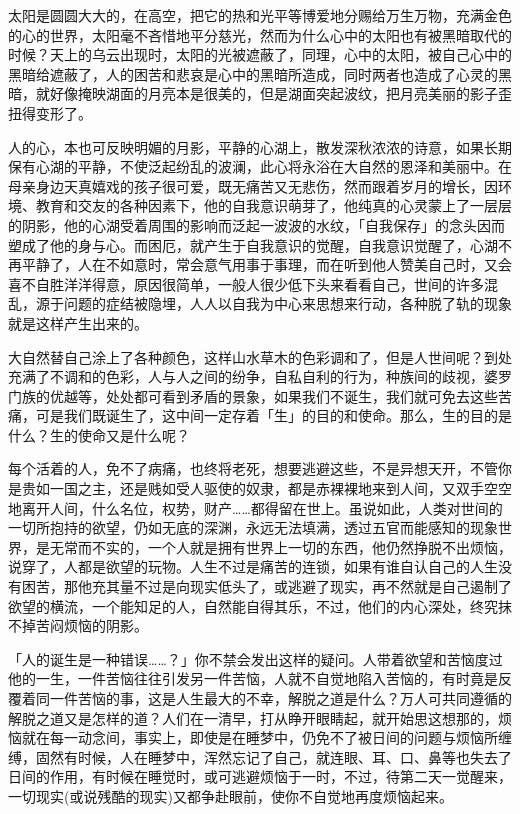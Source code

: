 \documentclass[twoside,openany]{book}
\begin{document}
太阳是圆圆大大的，在高空，把它的热和光平等博爱地分赐给万生万物，充满金色的心的世界，太阳毫不吝惜地平分慈光，然而为什么心中的太阳也有被黑暗取代的时候？天上的乌云出现时，太阳的光被遮蔽了，同理，心中的太阳，被自己心中的黑暗给遮蔽了，人的困苦和悲哀是心中的黑暗所造成，同时两者也造成了心灵的黑暗，就好像掩映湖面的月亮本是很美的，但是湖面突起波纹，把月亮美丽的影子歪扭得变形了。

人的心，本也可反映明媚的月影，平静的心湖上，散发深秋浓浓的诗意，如果长期保有心湖的平静，不使泛起纷乱的波澜，此心将永浴在大自然的恩泽和美丽中。在母亲身边天真嬉戏的孩子很可爱，既无痛苦又无悲伤，然而跟着岁月的增长，因环境、教育和交友的各种因素下，他的自我意识萌芽了，他纯真的心灵蒙上了一层层的阴影，他的心湖受着周围的影响而泛起一波波的水纹，「自我保存」的念头因而塑成了他的身与心。而困厄，就产生于自我意识的觉醒，自我意识觉醒了，心湖不再平静了，人在不如意时，常会意气用事于事理，而在听到他人赞美自己时，又会喜不自胜洋洋得意，原因很简单，一般人很少低下头来看看自己，世间的许多混乱，源于问题的症结被隐埋，人人以自我为中心来思想来行动，各种脱了轨的现象就是这样产生出来的。

大自然替自己涂上了各种颜色，这样山水草木的色彩调和了，但是人世间呢？到处充满了不调和的色彩，人与人之间的纷争，自私自利的行为，种族间的歧视，婆罗门族的优越等，处处都可看到矛盾的景象，如果我们不诞生，我们就可免去这些苦痛，可是我们既诞生了，这中间一定存着「生」的目的和使命。那么，生的目的是什么？生的使命又是什么呢？

每个活着的人，免不了病痛，也终将老死，想要逃避这些，不是异想天开，不管你是贵如一国之主，还是贱如受人驱使的奴隶，都是赤裸裸地来到人间，又双手空空地离开人间，什么名位，权势，财产……都得留在世上。虽说如此，人类对世间的一切所抱持的欲望，仍如无底的深渊，永远无法填满，透过五官而能感知的现象世界，是无常而不实的，一个人就是拥有世界上一切的东西，他仍然挣脱不出烦恼，说穿了，人都是欲望的玩物。人生不过是痛苦的连锁，如果有谁自认自己的人生没有困苦，那他充其量不过是向现实低头了，或逃避了现实，再不然就是自己遏制了欲望的横流，一个能知足的人，自然能自得其乐，不过，他们的内心深处，终究抹不掉苦闷烦恼的阴影。

「人的诞生是一种错误……？」你不禁会发出这样的疑问。人带着欲望和苦恼度过他的一生，一件苦恼往往引发另一件苦恼，人就不自觉地陷入苦恼的，有时竟是反覆着同一件苦恼的事，这是人生最大的不幸，解脱之道是什么？万人可共同遵循的解脱之道又是怎样的道？人们在一清早，打从睁开眼睛起，就开始思这想那的，烦恼就在每一动念间，事实上，即使是在睡梦中，仍免不了被日间的问题与烦恼所缠缚，固然有时候，人在睡梦中，浑然忘记了自己，就连眼、耳、口、鼻等也失去了日间的作用，有时候在睡觉时，或可逃避烦恼于一时，不过，待第二天一觉醒来，一切现实(或说残酷的现实)又都争赴眼前，使你不自觉地再度烦恼起来。
\end{document}
